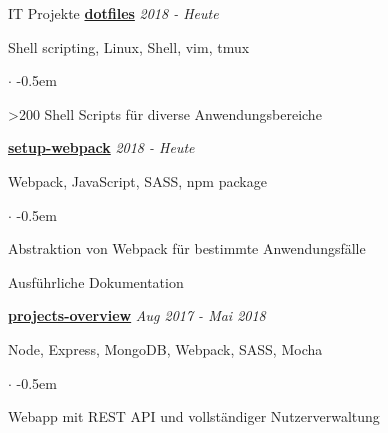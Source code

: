 \documentclass{cv}
\begin{document}
\begin{rSection}{IT Projekte}
  \textbf{\href{https://github.com/jneidel/dotfiles}{dotfiles}}
  \hfill
  {\em 2018 - Heute}

  Shell scripting, Linux, Shell, vim, tmux
  \begin{list}{$\cdot$}{}
    \itemsep -0.5em \vspace{-0.5em}
    \smallskip
    \item \textgreater200 Shell Scripts für diverse Anwendungsbereiche
  \end{list}

  \textbf{\href{https://github.com/jneidel/setup-webpack}{setup-webpack}}
  \hfill
  {\em 2018 - Heute}

  Webpack, JavaScript, SASS, npm package
  \begin{list}{$\cdot$}{}
    \itemsep -0.5em \vspace{-0.5em}
    \smallskip
    \item Abstraktion von Webpack für bestimmte Anwendungsfälle
    \item Ausführliche Dokumentation
  \end{list}

  \textbf{\href{https://github.com/jneidel/projects-overview}{projects-overview}}
  \hfill
  {\em Aug 2017 - Mai 2018}

  Node, Express, MongoDB, Webpack, SASS, Mocha
  \begin{list}{$\cdot$}{}
    \itemsep -0.5em \vspace{-0.5em}
    \smallskip
    \item Webapp mit REST API und vollständiger Nutzerverwaltung
  \end{list}



\end{rSection}
\end{document}
